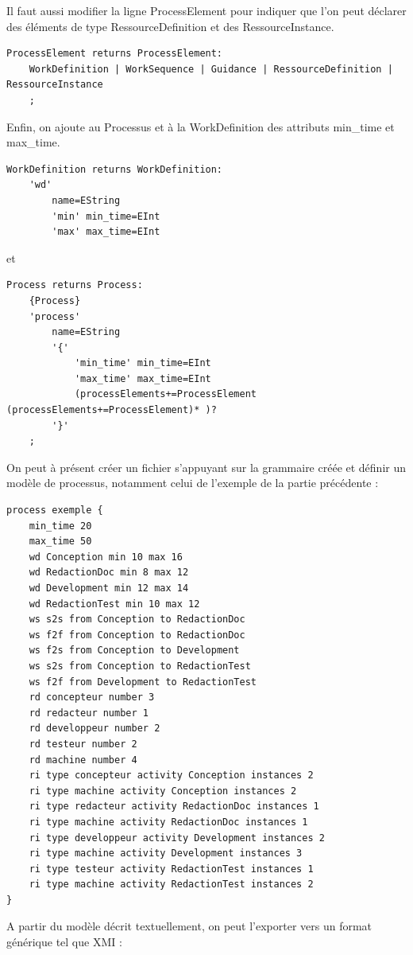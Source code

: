 \documentclass{report}
\begin{document}
Il faut aussi modifier la ligne ProcessElement pour indiquer que l'on peut déclarer des éléments de type RessourceDefinition et des RessourceInstance.

\begin{verbatim}
ProcessElement returns ProcessElement:
	WorkDefinition | WorkSequence | Guidance | RessourceDefinition | RessourceInstance
	;
\end{verbatim}

Enfin, on ajoute au Processus et à la WorkDefinition des attributs min\_time et max\_time.

\begin{verbatim}
WorkDefinition returns WorkDefinition:
	'wd'
		name=EString
		'min' min_time=EInt
		'max' max_time=EInt
\end{verbatim}

et

\begin{verbatim}
Process returns Process:
	{Process}
	'process'
		name=EString
		'{'
			'min_time' min_time=EInt
			'max_time' max_time=EInt
			(processElements+=ProcessElement (processElements+=ProcessElement)* )?
		'}'
	;
\end{verbatim}

On peut à présent créer un fichier s'appuyant sur la grammaire créée et définir un modèle de processus, notamment celui de l'exemple de la partie précédente :

\begin{verbatim}
process exemple {
	min_time 20
	max_time 50
	wd Conception min 10 max 16
	wd RedactionDoc min 8 max 12
	wd Development min 12 max 14
	wd RedactionTest min 10 max 12
	ws s2s from Conception to RedactionDoc
	ws f2f from Conception to RedactionDoc
	ws f2s from Conception to Development
	ws s2s from Conception to RedactionTest
	ws f2f from Development to RedactionTest
	rd concepteur number 3
	rd redacteur number 1
	rd developpeur number 2
	rd testeur number 2
	rd machine number 4
	ri type concepteur activity Conception instances 2
	ri type machine activity Conception instances 2
	ri type redacteur activity RedactionDoc instances 1
	ri type machine activity RedactionDoc instances 1
	ri type developpeur activity Development instances 2
	ri type machine activity Development instances 3
	ri type testeur activity RedactionTest instances 1
	ri type machine activity RedactionTest instances 2
}
\end{verbatim}

A partir du modèle décrit textuellement, on peut l'exporter vers un format générique tel que XMI :
\end{document}
